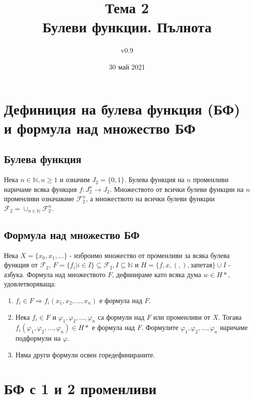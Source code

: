 \documentclass[fleqn,12pt]{article}
\title{Тема 2\\ Булеви функции. Пълнота}
\author{v0.9}
\date{30 май 2021}
\begin{document}
\maketitle

\tableofcontents

\begin{flushleft}

\section{Дефиниция на булева функция (БФ) и формула над множество БФ}

\subsection{Булева функция}
Нека $n \in \mathbb{N}, n \geq 1$ и означим $J_2 = \{ 0, 1 \}$. 
Булева функция на $n$ променливи наричаме всяка функция $f : J_2^n \rightarrow J_2$.
Множеството от всички булеви функции на $n$ променливи означаваме
$\mathcal{F}_2^n$, а множеството на всички булеви функции $\mathcal{F}_2 = \cup_{n \in \mathbb{N}} \mathcal{F}_2^n$.

\subsection{Формула над множество БФ}
Нека $X = \{ x_0, x_1, \dots \}$ - изброимо множество от променливи за
всяка булева функция от $\mathcal{F}_2$, $F = \{ f_i | i \in I \} \subseteq \mathcal{F}_2, I \subseteq \mathbb{N}$
и $H = \{ f, x, (, ), \text{запетая}  \} \cup I $ - азбука.
Формула над множеството $F$, дефинираме като всяка дума $w \in H*$, удовлетворяваща:
\begin{enumerate}
    \item $f_i \in F \Rightarrow f_i(x_1,x_2,\dots,x_n)$ е формула над $F$.
    \item \label{formulas:superposition} Нека $f_i \in F$ и $\varphi_1, \varphi_2, \dots, \varphi_n$ са формули над $F$ или променливи от $X$.
    Тогава $f_i(\varphi_1, \varphi_2, \dots, \varphi_n) \in H*$ е формула над $F$. Формулите $\varphi_1, \varphi_2, \dots, \varphi_n$ наричаме подформули на $\varphi$.
    \item Няма други формули освен горедефинираните.
\end{enumerate}

\section{БФ с 1 и 2 променливи}


\end{flushleft}
\end{document}
